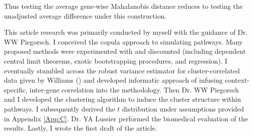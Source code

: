 \noindent Thus testing the average gene-wise Mahalanobis distance reduces to testing the unadjusted average difference under this construction.

This article research was primarily conducted by myself with the guidance of Dr. WW Piegorsch. I conceived the copula approach to simulating pathways. Many proposed methods were experimented with and discounted (including dependent central limit theorems, exotic bootstrapping procedures, and regression). I eventually stumbled across the robust variance estimator for cluster-correlated data given by Williams (\cite{Williams2000}) and developed informatic approach of infusing context-specific, inter-gene correlation into the methodology. Then Dr. WW Piegorsch and I developed the clustering algorithm to induce the cluster structure within pathways. I subsequently derived the $t$ distribution under assumptions provided in Appendix \ref{App:C}. Dr. YA Lussier performed the biomedical evaluation of the results. Lastly, I wrote the first draft of the article.
